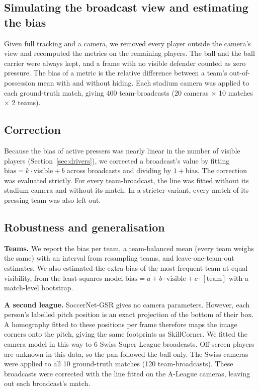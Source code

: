 \documentclass[]{interact}
\begin{document}
\subsection{Simulating the broadcast view and estimating the bias}
Given full tracking and a camera, we removed every player outside the camera's view and recomputed the metrics on the
remaining players. The ball and the ball carrier were always kept, and a frame with no visible defender counted as
zero pressure. The bias of a metric is the relative difference between a team's out-of-possession mean with and
without hiding. Each stadium camera was applied to each ground-truth match, giving 400 team-broadcasts
(20 cameras $\times$ 10 matches $\times$ 2 teams).

\subsection{Correction}
Because the bias of active pressers was nearly linear in the number of visible players (Section~\ref{sec:drivers}),
we corrected a broadcast's value by fitting $\text{bias} = k \cdot \text{visible} + b$ across broadcasts and dividing
by $1 + \text{bias}$. The correction was evaluated strictly. For every team-broadcast, the line was fitted without its
stadium camera and without its match. In a stricter variant, every match of its pressing team was also left out.

\subsection{Robustness and generalisation}
\label{sec:robust-methods}
\textbf{Teams.} We report the bias per team, a team-balanced mean (every team weighs the same) with an interval from
resampling teams, and leave-one-team-out estimates. We also estimated the extra bias of the most frequent team at
equal visibility, from the least-squares model $\text{bias} = a + b\cdot\text{visible} + c\cdot[\text{team}]$ with a
match-level bootstrap.

\textbf{A second league.} SoccerNet-GSR gives no camera parameters. However, each person's labelled pitch position
is an exact projection of the bottom of their box. A homography fitted to these positions per frame therefore maps the
image corners onto the pitch, giving the same footprints as SkillCorner. We fitted the camera model in this way to 6
Swiss Super League broadcasts. Off-screen players are unknown in this data, so the pan followed the ball only. The
Swiss cameras were applied to all 10 ground-truth matches (120 team-broadcasts). These broadcasts were corrected with
the line fitted on the A-League cameras, leaving out each broadcast's match.
\end{document}
